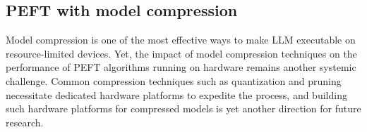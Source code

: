 \subsection{PEFT with model compression} Model compression is one of the most effective ways to make LLM executable on resource-limited devices. Yet, the impact of model compression techniques on the performance of PEFT algorithms running on hardware remains another systemic challenge. 
Common compression techniques such as quantization and pruning necessitate dedicated hardware platforms to expedite the process, and building such hardware platforms for compressed models is yet another direction for future research.